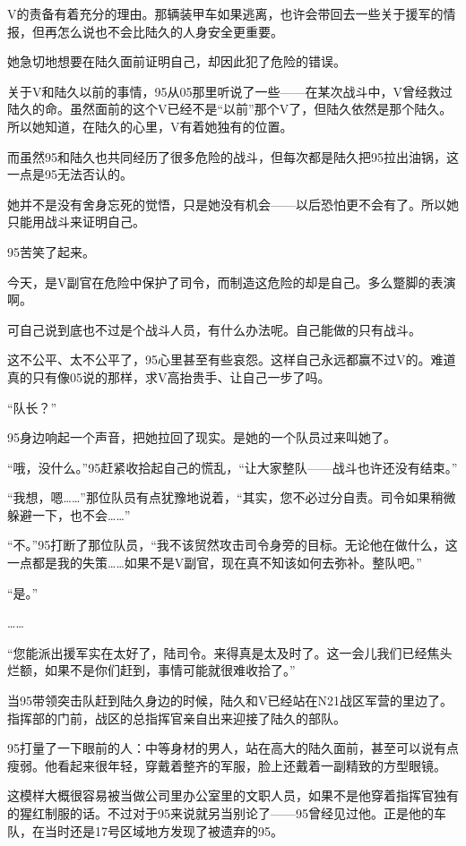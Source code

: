 V的责备有着充分的理由。那辆装甲车如果逃离，也许会带回去一些关于援军的情报，但再怎么说也不会比陆久的人身安全更重要。

她急切地想要在陆久面前证明自己，却因此犯了危险的错误。

关于V和陆久以前的事情，95从05那里听说了一些——在某次战斗中，V曾经救过陆久的命。虽然面前的这个V已经不是“以前”那个V了，但陆久依然是那个陆久。所以她知道，在陆久的心里，V有着她独有的位置。

而虽然95和陆久也共同经历了很多危险的战斗，但每次都是陆久把95拉出油锅，这一点是95无法否认的。

她并不是没有舍身忘死的觉悟，只是她没有机会——以后恐怕更不会有了。所以她只能用战斗来证明自己。

95苦笑了起来。

今天，是V副官在危险中保护了司令，而制造这危险的却是自己。多么蹩脚的表演啊。

可自己说到底也不过是个战斗人员，有什么办法呢。自己能做的只有战斗。

这不公平、太不公平了，95心里甚至有些哀怨。这样自己永远都赢不过V的。难道真的只有像05说的那样，求V高抬贵手、让自己一步了吗。

“队长？”

95身边响起一个声音，把她拉回了现实。是她的一个队员过来叫她了。

“哦，没什么。”95赶紧收拾起自己的慌乱，“让大家整队——战斗也许还没有结束。”

“我想，嗯……”那位队员有点犹豫地说着，“其实，您不必过分自责。司令如果稍微躲避一下，也不会……”

“不。”95打断了那位队员，“我不该贸然攻击司令身旁的目标。无论他在做什么，这一点都是我的失策……如果不是V副官，现在真不知该如何去弥补。整队吧。”

“是。”

……

“您能派出援军实在太好了，陆司令。来得真是太及时了。这一会儿我们已经焦头烂额，如果不是你们赶到，事情可能就很难收拾了。”

当95带领突击队赶到陆久身边的时候，陆久和V已经站在N21战区军营的里边了。指挥部的门前，战区的总指挥官亲自出来迎接了陆久的部队。

95打量了一下眼前的人：中等身材的男人，站在高大的陆久面前，甚至可以说有点瘦弱。他看起来很年轻，穿戴着整齐的军服，脸上还戴着一副精致的方型眼镜。

这模样大概很容易被当做公司里办公室里的文职人员，如果不是他穿着指挥官独有的猩红制服的话。不过对于95来说就另当别论了——95曾经见过他。正是他的车队，在当时还是17号区域地方发现了被遗弃的95。

